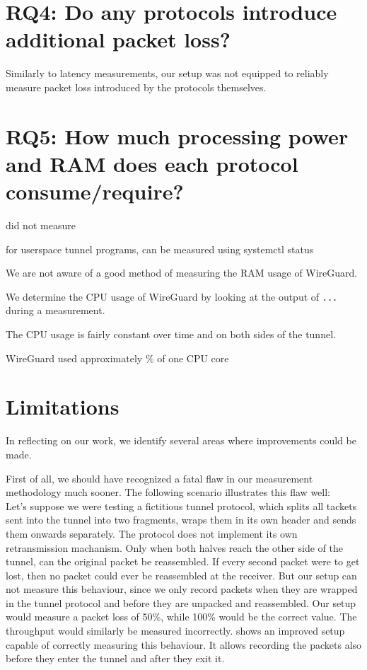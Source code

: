 \section{RQ4: Do any protocols introduce additional packet loss?}
Similarly to latency measurements, our setup was not equipped to reliably measure packet loss introduced by the protocols themselves.



\section{RQ5: How much processing power and RAM does each protocol consume/require?}
did not measure

for userspace tunnel programs, can be measured using systemctl status

We are not aware of a good method of measuring the RAM usage of WireGuard.

We determine the CPU usage of WireGuard by looking at the output of \texttt{...} during a measurement.

The CPU usage is fairly constant over time and on both sides of the tunnel.

WireGuard used approximately \% of one CPU core


\section{Limitations}
In reflecting on our work, we identify several areas where improvements could be made.

First of all, we should have recognized a fatal flaw in our measurement methodology much sooner.
The following scenario illustrates this flaw well:\\
Let's suppose we were testing a fictitious tunnel protocol, which splits all tackets sent into the tunnel into two fragments, wraps them in its own header and sends them onwards separately.
The protocol does not implement its own retransmission machanism.
Only when both halves reach the other side of the tunnel, can the original packet be reassembled.
If every second packet were to get lost, then no packet could ever be reassembled at the receiver.
But our setup can not measure this behaviour, since we only record packets when they are wrapped in the tunnel protocol and before they are unpacked and reassembled.
Our setup would measure a packet loss of 50\%, while 100\% would be the correct value.
The throughput would similarly be measured incorrectly.
 shows an improved setup capable of correctly measuring this behaviour.
It allows recording the packets also before they enter the tunnel and after they exit it.

